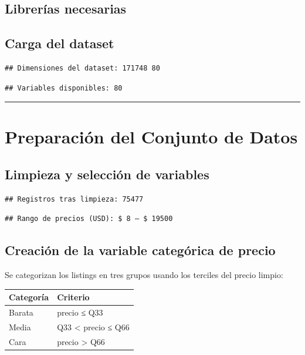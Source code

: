 \documentclass[
]{article}
\begin{document}
\subsection{Librerías necesarias}\label{libreruxedas-necesarias}

\subsection{Carga del dataset}\label{carga-del-dataset}

\begin{verbatim}
## Dimensiones del dataset: 171748 80
\end{verbatim}

\begin{verbatim}
## Variables disponibles: 80
\end{verbatim}

\begin{center}\rule{0.5\linewidth}{0.5pt}\end{center}

\section{Preparación del Conjunto de
Datos}\label{preparaciuxf3n-del-conjunto-de-datos}

\subsection{Limpieza y selección de
variables}\label{limpieza-y-selecciuxf3n-de-variables}

\begin{verbatim}
## Registros tras limpieza: 75477
\end{verbatim}

\begin{verbatim}
## Rango de precios (USD): $ 8 – $ 19500
\end{verbatim}

\subsection{Creación de la variable categórica de
precio}\label{creaciuxf3n-de-la-variable-categuxf3rica-de-precio}

Se categorizan los listings en tres grupos usando los terciles del
precio limpio:

\begin{longtable}[]{@{}ll@{}}
\toprule\noalign{}
Categoría & Criterio \\
\midrule\noalign{}
\endhead
\bottomrule\noalign{}
\endlastfoot
Barata & precio ≤ Q33 \\
Media & Q33 \textless{} precio ≤ Q66 \\
Cara & precio \textgreater{} Q66 \\
\end{longtable}
\end{document}
